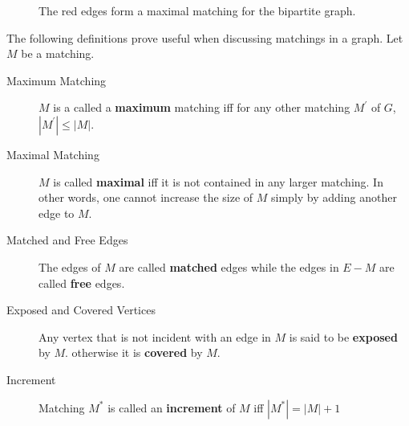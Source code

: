 \documentclass [12pt]{article}
\theoremstyle{definition}
\begin{document}
\begin{figure}
\centering
{}
\caption{The red edges form a maximal matching for the bipartite graph.}
\label{figure:bipartite2}
\end{figure}

The following definitions prove useful when discussing matchings in a graph. Let $M$ be a matching.

\begin{description}
\item[Maximum Matching] $M$ is a called a {\bf maximum} matching
iff for any other matching $M^{\prime}$ of $G$, $|M^{\prime}|\leq |M|$.


\item[Maximal Matching] $M$ is called {\bf maximal} iff it is not contained in any larger matching. In other words, one cannot increase the size of $M$ simply by adding another edge to 
$M$.

\item[Matched and Free Edges] The edges of $M$ are called {\bf matched} edges while the edges in $E-M$ are called {\bf free} edges.

\item[Exposed and Covered Vertices] Any vertex that is not incident with an edge in $M$ is said to be {\bf exposed} by $M$.
otherwise it is {\bf covered} by $M$.

\item[Increment] Matching $M^{*}$ is called an \textbf{increment} of $M$ iff $|M^{*}|=|M|+1$
\end{description}
\end{document}
